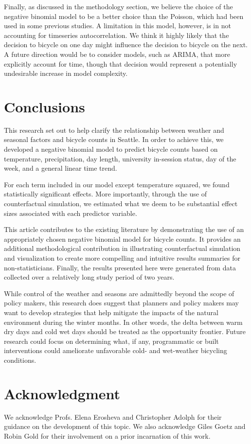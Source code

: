 \documentclass[12pt,letterpaper,article]{memoir}
\begin{document}
Finally, as discussed in the methodology section, we believe the
choice of the negative binomial model to be a better choice than the
Poisson, which had been used in some previous studies. A limitation in
this model, however, is in not accounting for timeseries
autocorrelation. We think it highly likely that the decision to
bicycle on one day might influence the decision to bicycle on the
next. A future direction would be to consider models, such as ARIMA,
that more explicitly account for time, though that decision would
represent a potentially undesirable increase in model complexity.

\chapter*{Conclusions}
This research set out to help clarify the relationship between weather
and seasonal factors and bicycle counts in Seattle. In order to
achieve this, we developed a negative binomial model to predict
bicycle counts based on temperature, precipitation, day length,
university in-session status, day of the week, and a general linear
time trend.

For each term included in our model except temperature squared, we
found statistically significant effects. More importantly, through the
use of counterfactual simulation, we estimated what we deem to be
substantial effect sizes associated with each predictor variable.

This article contributes to the existing literature by demonstrating
the use of an appropriately chosen negative binomial model for bicycle
counts. It provides an additional methodological contribution in
illustrating counterfactual simulation and visualization to create
more compelling and intuitive results summaries for
non-statisticians. Finally, the results presented here were generated
from data collected over a relatively long study period of two years.

While control of the weather and seasons are admittedly beyond the
scope of policy makers, this research does suggest that planners and
policy makers may want to develop strategies that help mitigate the
impacts of the natural environment during the winter months. In other
words, the delta between warm dry days and cold wet days should be
treated as the opportunity frontier. Future research could focus on
determining what, if any, programmatic or built interventions could
ameliorate unfavorable cold- and wet-weather bicycling conditions.

\chapter*{Acknowledgment}
We acknowledge Profs. Elena Erosheva and Christopher Adolph for their
guidance on the development of this topic. We also acknowledge Giles
Goetz and Robin Gold for their involvement on a prior incarnation of
this work.

\printbibliography
\end{document}
